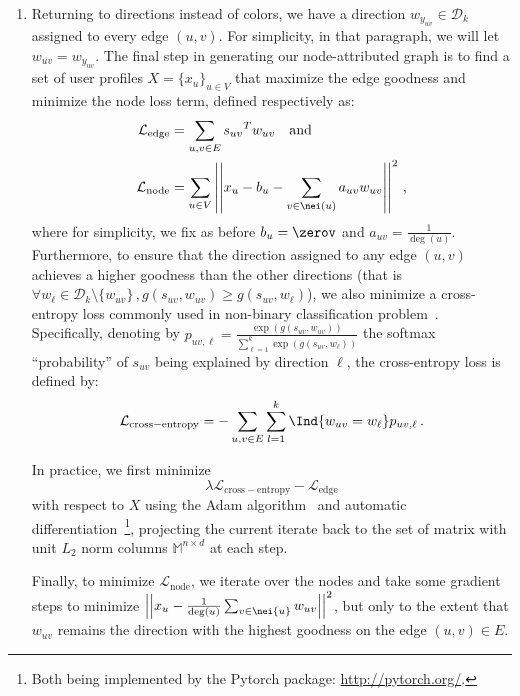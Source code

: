 \begin{enumerate}[1),leftmargin=*]
\item
Returning to directions instead of colors, we have a direction $w_{y_{uv}} \in \mathcal{D}_k$
assigned to every edge $(u,v)$. For simplicity, in that paragraph, we will let $w_{uv} = w_{y_{uv}}$.
The final step in generating our node-attributed graph is to
find a set of user profiles $X=\{x_u\}_{u\in V}$ that maximize the edge goodness and minimize the node
loss term, defined respectively as:
\begin{align*}
  \mathcal{L}_{\mathrm{edge}} &=
  \sum_{u,v \in E} {s_{uv}}^T w_{uv} \quad \text{and} \\
  \mathcal{L}_{\mathrm{node}} &=
  \sum_{u\in V} \left|\left| x_u - b_u - \sum_{v \in \nei(u)} a_{uv} w_{uv} \right|\right|^2\,,
\end{align*}
where for simplicity, we fix as before $b_u = \zerov$ and $a_{uv} = \frac{1}{\deg(u)}$. Furthermore, to ensure that the
direction assigned to any edge $(u,v)$ achieves a higher goodness than the other directions (that is
$\forall w_\ell \in \mathcal{D}_k \setminus \{w_{uv}\}\,, g(s_{uv}, w_{uv}) \geq  g(s_{uv},
w_\ell)$), we also minimize a cross-entropy loss commonly used in non-binary classification
problem~\autocite[Section 4.3.4]{PRML06}.  Specifically, denoting by $p_{uv,\ell} = \frac{\exp
\left( g(s_{uv}, w_{uv}) \right)}{\sum_{\ell=1}^k \exp \left( g(s_{uv}, w_\ell) \right)}$ the
softmax \enquote{probability} of $s_{uv}$ being explained by direction $\ell$, the cross-entropy
loss is defined by:
\begin{equation}
  \label{eq:edge_cross}
  \mathcal{L}_{\mathrm{cross-entropy}} = -\sum_{u,v \in E} \sum_{l=1}^k
  \Ind{w_{uv} = w_\ell} p_{uv,\ell}\,.
\end{equation}

In practice, we first minimize
\begin{equation}
  \label{eq:edge_cross_edge}
  \lambda \mathcal{L}_{\mathrm{cross-entropy}} - \mathcal{L}_{\mathrm{edge}}
\end{equation}
with respect to $X$ using the Adam algorithm~\autocite{Adam15} and
automatic differentiation~\autocite{autograd15}\footnote{Both being implemented by the Pytorch
package: \url{http://pytorch.org/}.}, projecting the current iterate back to the set of
matrix with unit $L_2$ norm columns $\mathbb{M}^{n\times d}$ at each step.

Finally, to minimize $\mathcal{L}_{\mathrm{node}}$, we iterate over the nodes and take some gradient
steps to minimize $\left|\left| x_u - \frac{1}{\deg(u)} \sum_{v\in\nei{u}} w_{uv}\right|\right|^2$, but only to the
extent that $w_{uv}$ remains the direction with the highest goodness on the edge $(u,v) \in E$.
\end{enumerate}

